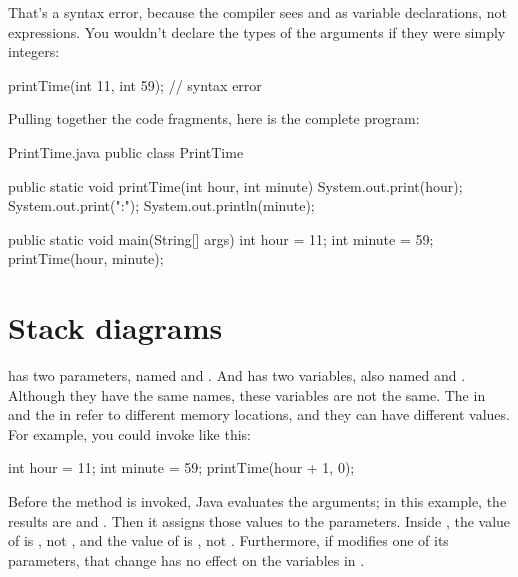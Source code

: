 That's a syntax error, because the compiler sees  and  as variable declarations, not expressions.
You wouldn't declare the types of the arguments if they were simply integers:

\begin{code}
printTime(int 11, int 59);  // syntax error
\end{code}

Pulling together the code fragments, here is the complete program:


\begin{trinket}[340]{PrintTime.java}
public class PrintTime {

    public static void printTime(int hour, int minute) {
        System.out.print(hour);
        System.out.print(":");
        System.out.println(minute);
    }

    public static void main(String[] args) {
        int hour = 11;
        int minute = 59;
        printTime(hour, minute);
    }
}
\end{trinket}


\section{Stack diagrams}
\label{stack}

 has two parameters, named  and .
And  has two variables, also named  and .
Although they have the same names, these variables are not the same.
The  in  and the  in  refer to different memory locations, and they can have different values.
For example, you could invoke  like this:

\begin{code}
int hour = 11;
int minute = 59;
printTime(hour + 1, 0);
\end{code}

Before the method is invoked, Java evaluates the arguments; in this example, the results are  and .
Then it assigns those values to the parameters.
Inside , the value of  is , not , and the value of  is , not .
Furthermore, if  modifies one of its parameters, that change has no effect on the variables in .


